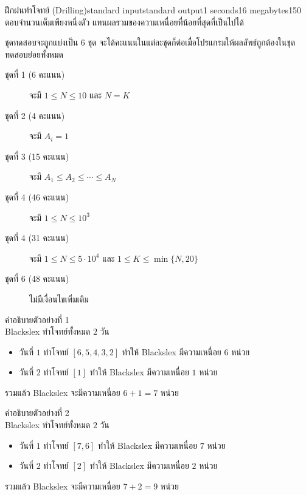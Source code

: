 \documentclass[11pt,a4paper]{article}
\begin{document}
\begin{problem}{ฝึกฝนทำโจทย์ (Drilling)}{standard input}{standard output}{1 seconds}{16 megabytes}{150}
\OutputFile
ตอบจำนวนเต็มเพียงหนึ่งตัว แทนผลรวมของความเหนื่อยที่น้อยที่สุดที่เป็นไปได้

\Scoring
ชุดทดสอบจะถูกแบ่งเป็น 6 ชุด จะได้คะแนนในแต่ละชุดก็ต่อเมื่อโปรแกรมให้ผลลัพธ์ถูกต้องในชุดทดสอบย่อยทั้งหมด

\begin{description}

\item[ชุดที่ 1 (6 คะแนน)] จะมี $1\leq N\leq 10$ และ $N=K$
\item[ชุดที่ 2 (4 คะแนน)] จะมี $A_i=1$
\item[ชุดที่ 3 (15 คะแนน)] จะมี $A_1\leq A_2\leq\cdots\leq A_N$
\item[ชุดที่ 4 (46 คะแนน)] จะมี $1\leq N\leq 10^3$
\item[ชุดที่ 4 (31 คะแนน)] จะมี $1\leq N\leq 5\cdot 10^4$ และ $1\leq K\leq\min\{N,20\}$
\item[ชุดที่ 6 (48 คะแนน)] ไม่มีเงื่อนไขเพิ่มเติม

\end{description}

\Examples

\begin{example}
%
%
\end{example}

\Note

คำอธิบายตัวอย่างที่ 1 \\
Blackslex ทำโจทย์ทั้งหมด $2$ วัน
\begin{itemize}
    \item วันที่ $1$ ทำโจทย์ $[6,5,4,3,2]$ ทำให้ Blackslex มีความเหนื่อย $6$ หน่วย
    \item วันที่ $2$ ทำโจทย์ $[1]$ ทำให้ Blackslex มีความเหนื่อย $1$ หน่วย
\end{itemize}
รวมแล้ว Blackslex จะมีความเหนื่อย $6+1=7$ หน่วย

คำอธิบายตัวอย่างที่ 2 \\
Blackslex ทำโจทย์ทั้งหมด $2$ วัน
\begin{itemize}
    \item วันที่ $1$ ทำโจทย์ $[7,6]$ ทำให้ Blackslex มีความเหนื่อย $7$ หน่วย
    \item วันที่ $2$ ทำโจทย์ $[2]$ ทำให้ Blackslex มีความเหนื่อย $2$ หน่วย
\end{itemize}
รวมแล้ว Blackslex จะมีความเหนื่อย $7+2=9$ หน่วย

\end{problem}
\end{document}
